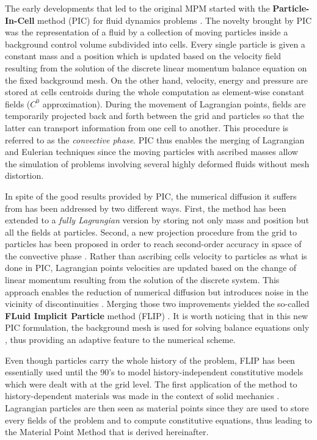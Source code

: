 The early developments that led to the original MPM started with the \textbf{Particle-In-Cell} method (PIC) for fluid dynamics problems \cite{PIC}. The novelty brought by PIC was the representation of a fluid by a collection of moving particles inside a background control volume subdivided into cells. Every single particle is given a constant mass and a position which is updated based on the velocity field resulting from the solution of the discrete linear momentum balance equation on the fixed background mesh. On the other hand, velocity, energy and pressure are stored at cells centroids during the whole computation as element-wise constant fields ($C^0$ approximation). 
During the movement of Lagrangian points, fields are temporarily projected back and forth between the grid and particles so that the latter can transport information from one cell to another. This procedure is referred to as the \textit{convective phase}. PIC thus enables the merging of Lagrangian and Eulerian techniques since the moving particles with ascribed masses allow the simulation of problems involving several highly deformed fluids without mesh distortion.

In spite of the good results provided by PIC, the numerical diffusion it suffers from has been addressed by two different ways. First, the method has been extended to a \textit{fully Lagrangian} version \cite{McCrory_FLIP} by storing not only mass and position but all the fields at particles. Second, a new projection procedure from the grid to particles has been proposed in order to reach second-order accuracy in space of the convective phase \cite{PIC_Nishiguchi}. 
Rather than ascribing cells velocity to particles as what is done in PIC, Lagrangian points velocities are updated based on the change of linear momentum resulting from the solution of the discrete system. This approach enables the reduction of numerical diffusion but introduces noise in the vicinity of discontinuities \cite{Mass_Flip}.
Merging those two improvements yielded the so-called \textbf{FLuid Implicit Particle} method (FLIP) \cite{FLIP}. It is worth noticing that in this new PIC formulation, the background mesh is used for solving balance equations only , thus providing an adaptive feature to the numerical scheme. 


Even though particles carry the whole history of the problem, FLIP has been essentially used until the 90's to model history-independent constitutive models which were dealt with at the grid level. The first application of the method to history-dependent materials was made in the context of solid mechanics \cite{Sulsky94}. Lagrangian particles are then seen as material points since they are used to store every fields of the problem and to compute constitutive equations, thus leading to the Material Point Method that is derived hereinafter. 

